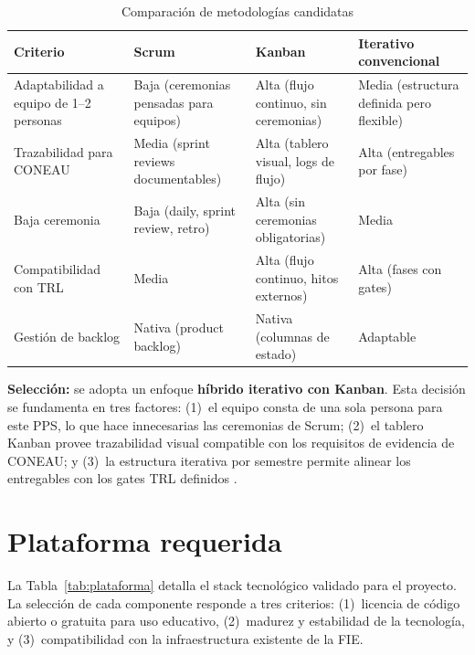 \documentclass[a4paper, 12pt]{article}
\begin{document}
\begin{table}[htbp]
  \centering
  \caption{Comparaci\'on de metodolog\'ias candidatas}
  \label{tab:metodologias}
  \begin{tabularx}{\textwidth}{l>{\raggedright\arraybackslash}X>{\raggedright\arraybackslash}X>{\raggedright\arraybackslash}X}
    \toprule
    \textbf{Criterio} & \textbf{Scrum} & \textbf{Kanban} & \textbf{Iterativo convencional} \\
    \midrule
    Adaptabilidad a equipo de 1--2 personas & Baja (ceremonias pensadas para equipos) & Alta (flujo continuo, sin ceremonias) & Media (estructura definida pero flexible) \\
    Trazabilidad para CONEAU & Media (sprint reviews documentables) & Alta (tablero visual, logs de flujo) & Alta (entregables por fase) \\
    Baja ceremonia & Baja (daily, sprint review, retro) & Alta (sin ceremonias obligatorias) & Media \\
    Compatibilidad con TRL & Media & Alta (flujo continuo, hitos externos) & Alta (fases con gates) \\
    Gesti\'on de backlog & Nativa (product backlog) & Nativa (columnas de estado) & Adaptable \\
    \bottomrule
  \end{tabularx}
\end{table}

\textbf{Selecci\'on:} se adopta un enfoque \textbf{h\'ibrido iterativo con Kanban}. Esta decisi\'on se fundamenta en tres factores: (1)~el equipo consta de una sola persona para este PPS, lo que hace innecesarias las ceremonias de Scrum; (2)~el tablero Kanban provee trazabilidad visual compatible con los requisitos de evidencia de \ac{CONEAU}; y (3)~la estructura iterativa por semestre permite alinear los entregables con los gates \ac{TRL} definidos \parencite{anderson2010, schwaber2020}.

\section{Plataforma requerida}

La Tabla~\ref{tab:plataforma} detalla el stack tecnol\'ogico validado para el proyecto. La selecci\'on de cada componente responde a tres criterios: (1)~licencia de c\'odigo abierto o gratuita para uso educativo, (2)~madurez y estabilidad de la tecnolog\'ia, y (3)~compatibilidad con la infraestructura existente de la \ac{FIE}.
\end{document}
